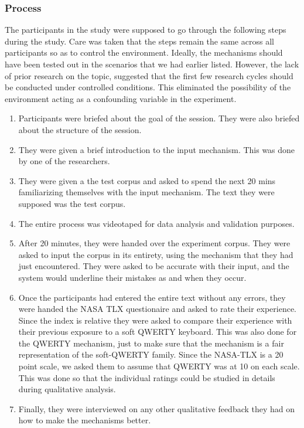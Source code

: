 \subsubsection{Process}

The participants in the study were supposed to go through the
following steps during the study. Care was taken that the steps remain
the same across all participants so as to control the
environment. Ideally, the mechanisms should have been tested out in
the scenarios that we had earlier listed. However, the lack of prior
research on the topic, suggested that the first few research cycles
should be conducted under controlled conditions. This eliminated the
possibility of the environment acting as a confounding variable in the
experiment.

\begin{enumerate}
\item Participants were briefed about the goal of the session. They
  were also briefed about the structure of the session.
\item They were given a brief introduction to the input
  mechanism. This was done by one of the researchers.
\item They were given a the test corpus and asked to spend the next 20
  mins familiarizing themselves with the input mechanism. The text
  they were supposed was the test corpus.
\item The entire process was videotaped for data analysis and
  validation purposes.
\item After 20 minutes, they were handed over the experiment
  corpus. They were asked to input the corpus in its entirety, using
  the mechanism that they had just encountered. They were asked to be
  accurate with their input, and the system would underline their
  mistakes as and when they occur.
\item Once the participants had entered the entire text without any
  errors, they were handed the NASA TLX questionaire and asked to rate
  their experience. Since the index is relative they were asked to
  compare their experience with their previous exposure to a soft
  QWERTY keyboard. This was also done for the QWERTY mechanism, just
  to make sure that the mechanism is a fair representation of the
  soft-QWERTY family. Since the NASA-TLX is a 20 point scale, we asked
  them to assume that QWERTY was at 10 on each scale. This was done so
  that the individual ratings could be studied in details during
  qualitative analysis.
\item Finally, they were interviewed on any other qualitative feedback
  they had on how to make the mechanisms better.
\end{enumerate}
	